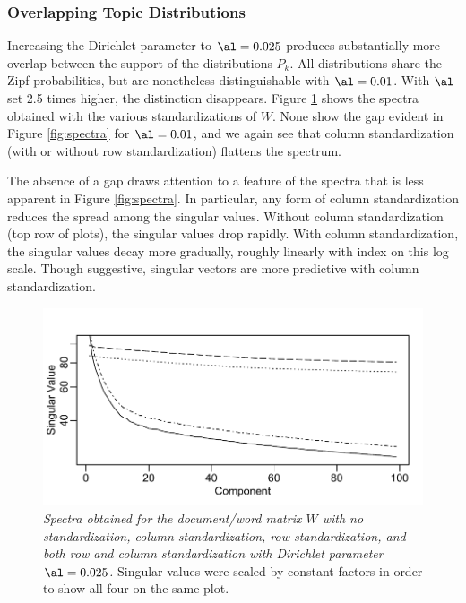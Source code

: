 \documentclass[12pt]{article}
\begin{document}
 
 \subsubsection{Overlapping Topic Distributions} %
 
Increasing the Dirichlet parameter to $\al=0.025$ produces substantially more overlap between the support of the distributions $P_k$.  All distributions share the Zipf probabilities, but are nonetheless distinguishable with $\al=0.01$.  With $\al$ set 2.5 times higher, the distinction disappears.  Figure \ref{fig:spectratwo} shows the spectra obtained with the various standardizations of $W$.  None show the gap evident in Figure \ref{fig:spectra} for $\al=0.01$, and we again see that column standardization (with or without row standardization) flattens the spectrum.  


The absence of a gap draws attention to a feature of the spectra that is less apparent in Figure \ref{fig:spectra}.  In particular, any form of column standardization reduces the spread among the singular values.  Without column standardization (top row of plots), the singular values drop rapidly.  With column standardization, the singular values decay more gradually, roughly linearly with index on this log scale.  Though suggestive, singular vectors are more predictive with column standardization.

 
\begin{figure}
\caption{ \label{fig:spectratwo} 
{ \sl Spectra obtained for the document/word matrix $W$ with no standardization, column standardization, row standardization, and both row and column standardization with Dirichlet parameter $\al = 0.025$.}  Singular values were scaled by constant factors in order to show all four on the same plot.}
 \centerline{
 \vspace{0.1in}
 \includegraphics[width=6.0in]{figures/spectra2} }
 \end{figure}
\end{document}
